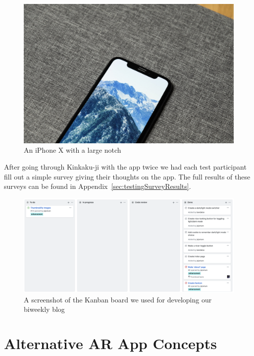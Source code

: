 \documentclass[a4paper, 10pt, american, titlepage]{article}
\begin{document}
\begin{figure}[h]
	\centering
	\includegraphics[width=\textwidth]{iphone-x.jpg}
	\caption[An iPhone X with a large notch]{An iPhone X with a large
		notch~\autocite{yoo2017}}
	\label{fig:iPhoneX}
\end{figure}

After going through Kinkaku-ji with the app twice we had each test participant
fill out a simple survey giving their thoughts on the app. The full results of
these surveys can be found in Appendix~\ref{sec:testingSurveyResults}.

\begin{figure}[h]
	\centering
	\includegraphics[width=\textwidth]{kanban-board.png}
	\caption{A screenshot of the Kanban board we used for developing our
    biweekly blog}
	\label{fig:kanbanBoard}
\end{figure}

\clearpage

\section{Alternative AR App Concepts}
\label{sec:alternativeArAppConcepts}
\end{document}
